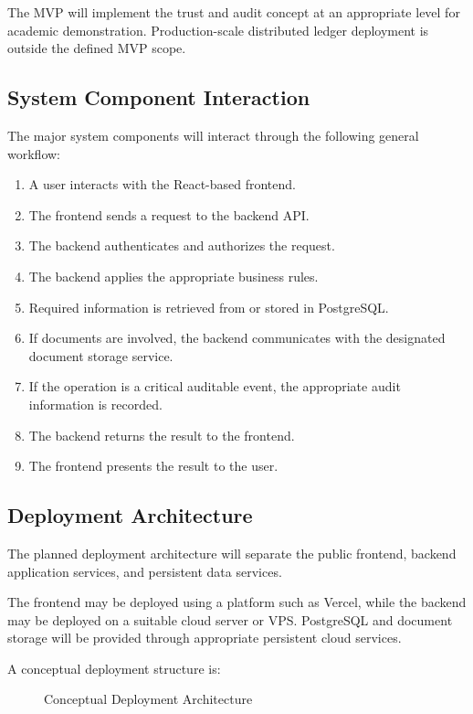The MVP will implement the trust and audit concept at an appropriate level
for academic demonstration. Production-scale distributed ledger
deployment is outside the defined MVP scope.


\subsection{System Component Interaction}

The major system components will interact through the following general
workflow:

\begin{enumerate}
    \item A user interacts with the React-based frontend.
    \item The frontend sends a request to the backend API.
    \item The backend authenticates and authorizes the request.
    \item The backend applies the appropriate business rules.
    \item Required information is retrieved from or stored in PostgreSQL.
    \item If documents are involved, the backend communicates with the
    designated document storage service.
    \item If the operation is a critical auditable event, the appropriate
    audit information is recorded.
    \item The backend returns the result to the frontend.
    \item The frontend presents the result to the user.
\end{enumerate}


\subsection{Deployment Architecture}

The planned deployment architecture will separate the public frontend,
backend application services, and persistent data services.

The frontend may be deployed using a platform such as Vercel, while the
backend may be deployed on a suitable cloud server or VPS. PostgreSQL and
document storage will be provided through appropriate persistent cloud
services.

A conceptual deployment structure is:

\begin{figure}[H]
    \centering
    \caption{Conceptual Deployment Architecture}
    \label{fig:deployment_architecture}
\end{figure}

